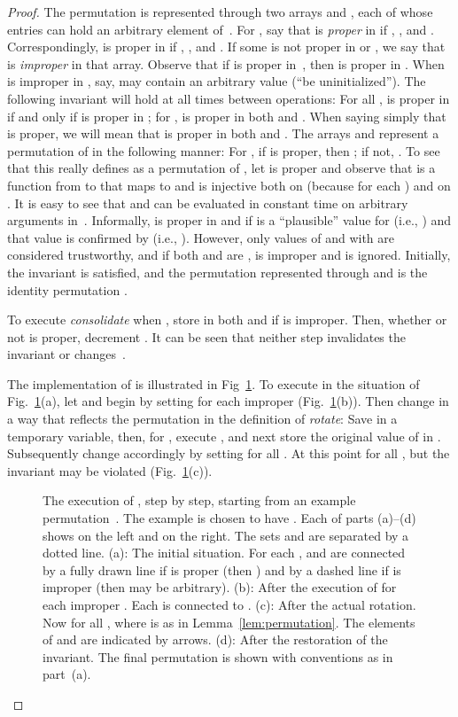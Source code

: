 \documentclass[envcountsame,envcountsect,undated,nolinenumbers]{lnthi}
\def\Tvn#1{\hbox{\textit{#1\/}}}
\begin{document}
\begin{proof}
The permutation  is represented through two
arrays  and ,
each of whose entries can hold an arbitrary element of~.
For , say that  is \emph{proper}
in  if , , and
.
Correspondingly,  is proper in 
if , , and
.
If some  is not proper in  or ,
we say that  is \emph{improper} in that array.
Observe that if  is proper in~,
then  is proper in .
When  is improper in , say, 
may contain an arbitrary value
(``be uninitialized'').
The following invariant will hold at all times
between operations:
For all ,  is proper in 
if and only if  is proper in ;
for ,  is proper in both  and .
When saying simply that  is proper,
we will mean that  is proper in both  and .
The arrays  and  represent a
permutation  of  in the following manner:
For , if  is proper,
then ; if not, .
To see that this really defines  as a
permutation of , let  is proper
and observe that  is a function from  to  that
maps  to  and is injective both on 
(because  for each )
and on .
It is easy to see that
 and  can be evaluated in
constant time on arbitrary arguments in~.
Informally,  is proper in 
and  if  is a ``plausible''
value for  (i.e., )
and that value is confirmed by 
(i.e., ).
However, only values of  and 
with  are considered trustworthy,
and if both  and  are ,
 is improper and  is ignored.
Initially, the invariant is
satisfied, and the permutation 
represented through  and  is
the identity permutation .

To execute \Tvn{consolidate} when ,
store  in both  and 
if  is improper.
Then, whether or not  is proper, decrement .
It can be seen that neither step
invalidates the invariant or changes~.

The implementation of
 is illustrated in
Fig~\ref{fig:rotation}.
To execute 
in the situation of
Fig.~\ref{fig:rotation}(a),
let  and begin by
setting  for each improper 
(Fig.~\ref{fig:rotation}(b)).
Then change  in a way that
reflects the permutation  in the
definition of \Tvn{rotate}:
Save  in a temporary variable,
then, for ,
execute , and
next store the original value of  in .
Subsequently change  accordingly
by setting  for all .
At this point  for all ,
but the invariant may be violated
(Fig.~\ref{fig:rotation}(c)).

\begin{figure}
\begin{center}
\end{center}
\caption{The execution of , step
by step, starting from an example permutation~.
The example is chosen to have .
Each of parts (a)--(d) shows  on the left
and  on the right.
The sets  and 
are separated by a dotted line.
(a): The initial situation.
For each ,  and  are connected by a fully
drawn line if  is proper (then ) and by a dashed line if
 is improper (then  may be arbitrary).
(b): After the execution of  for each improper .
Each  is connected to .
(c): After the actual rotation.
Now  for all ,
where  is as in Lemma~\ref{lem:permutation}.
The elements of  and 
are indicated by arrows.
(d): After the restoration of the invariant.
The final permutation is shown
with conventions as in part~(a).}
\label{fig:rotation}
\end{figure}


\end{proof}
\end{document}
